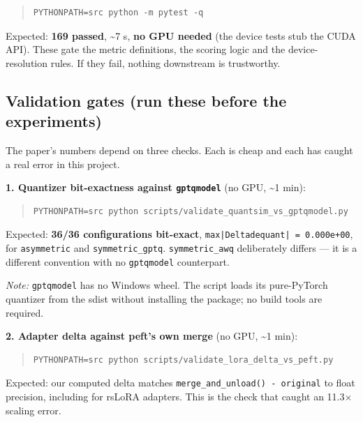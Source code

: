 \begin{quote}\footnotesize\begin{verbatim}
PYTHONPATH=src python -m pytest -q
\end{verbatim}\end{quote}

Expected: \textbf{169 passed}, \textasciitilde{}7 s, \textbf{no GPU needed} (the device tests stub the CUDA API). These gate the metric definitions, the scoring logic and the device-resolution rules. If they fail, nothing downstream is trustworthy.

\subsection{Validation gates (run these before the experiments)}

The paper's numbers depend on three checks. Each is cheap and each has caught a real error in this project.

\textbf{1. Quantizer bit-exactness against \texttt{gptqmodel}} (no GPU, \textasciitilde{}1 min):

\begin{quote}\tiny\begin{verbatim}
PYTHONPATH=src python scripts/validate_quantsim_vs_gptqmodel.py
\end{verbatim}\end{quote}

Expected: \textbf{36/36 configurations bit-exact}, \texttt{max|Deltadequant| = 0.\allowbreak{}000e+00}, for \texttt{asymmetric} and \texttt{symmetric\_\allowbreak{}gptq}. \texttt{symmetric\_\allowbreak{}awq} deliberately differs --- it is a different convention with no \texttt{gptqmodel} counterpart.

\emph{Note:} \texttt{gptqmodel} has no Windows wheel. The script loads its pure-PyTorch quantizer from the sdist without installing the package; no build tools are required.

\textbf{2. Adapter delta against peft's own merge} (no GPU, \textasciitilde{}1 min):

\begin{quote}\tiny\begin{verbatim}
PYTHONPATH=src python scripts/validate_lora_delta_vs_peft.py
\end{verbatim}\end{quote}

Expected: our computed delta matches \texttt{merge\_\allowbreak{}and\_\allowbreak{}unload() - original} to float precision, including for rsLoRA adapters. This is the check that caught an 11.3$\times$ scaling error.

